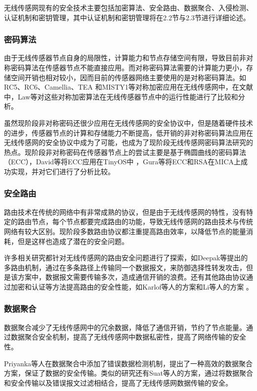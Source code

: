 无线传感网现有的安全技术主要包括加密算法、安全路由、数据聚合、入侵检测、认证机制和密钥管理，其中认证机制和密钥管理将在2.2节与2.3节进行详细论述。

\subsubsection{密码算法}
由于无线传感器节点自身的局限性，计算能力和节点存储空间有限，导致目前非对称密码算法在传感器节点不能直接应用。而对称密码算法需要的计算能力更小，存储空间开销也相对较小，因而目前的传感器网络主要使用的是对称密码算法。如RC5、RC6、Camellia、TEA 和MISTY1等对称加密应用在无线传感网中，在文献\cite{c1:encryptionCompare}中，Law等对这些对称加密算法在无线传感器节点中的运行性能进行了比较和分析。

虽然现阶段非对称密码还很少应用在无线传感网的安全协议中，但是随着硬件技术的进步，传感器节点的计算和存储能力不断提高，低开销的非对称密码算法应用在无线传感网的安全协议中成为了可能，也成为了现阶段无线传感网密码算法研究的热点。现阶段非对称密码在传感器节点上的尝试主要是基于椭圆曲线的密码算法（ECC），David等将ECC应用在TinyOS中
，Gura等将ECC和RSA在MICA上成功实现，并对它们进行了分析比较。
\subsubsection{安全路由}
路由技术在传统的网络中有非常成熟的协议，但是由于无线传感网的特性，没有特定的路由节点，每个节点都要完成路由的功能，导致无线传感网的路由技术与传统网络有较大区别。现阶段多数路由协议都注重提高路由效率，以降低节点的能量消耗，但是这样也造成了潜在的安全问题。

许多相关研究都针对无线传感网的路由安全问题进行了探索，如Deepak等提出的多路由机制，通过在多条路径上传输同一个数据报文，来防御选择性转发攻击，但是该方案中，数据报文需要传输多次，造成通信开销的浪费。还有其他路由协议通过加密和认证等方法提高路由的安全性能，如Karlof等人的方案和Li等人的方案
。
\subsubsection{数据聚合}
数据聚合减少了无线传感网中的冗余数据，降低了通信开销，节约了节点能量。通过数据聚合安全机制，提高了无线传感网中数据私密性，提高了网络传输的安全性。

Priyanka等人在数据聚合中添加了错误数据检测机制，提出了一种高效的数据聚合方案，保证了数据的安全传输。类似的研究还有Suat等人的方案，通过将数据聚合和安全传输以及错误报文过滤相结合，提高了无线传感网数据传输的安全。

